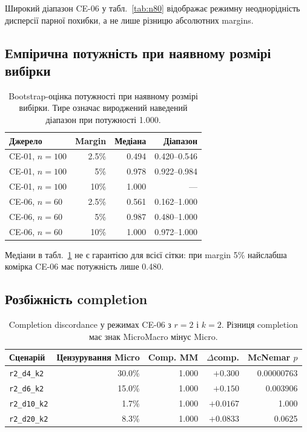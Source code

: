 \documentclass[11pt,a4paper]{article}
\begin{document}
Широкий діапазон CE-06 у табл.~\ref{tab:n80} відображає режимну
неоднорідність дисперсії парної похибки, а не лише різницю абсолютних margins.

\subsection{Емпірична потужність при наявному розмірі вибірки}

\begin{table}[H]
\centering
\caption{Bootstrap-оцінка потужності при наявному розмірі вибірки.
Тире означає вироджений наведений діапазон при потужності 1.000.}
\label{tab:power}
\begin{tabular}{lrrr}
\toprule
Джерело & Margin & Медіана & Діапазон \\
\midrule
CE-01, $n=100$ & 2.5\% & 0.494 & 0.420--0.546 \\
CE-01, $n=100$ & 5\%   & 0.978 & 0.922--0.984 \\
CE-01, $n=100$ & 10\%  & 1.000 & --- \\
CE-06, $n=60$  & 2.5\% & 0.561 & 0.162--1.000 \\
CE-06, $n=60$  & 5\%   & 0.987 & 0.480--1.000 \\
CE-06, $n=60$  & 10\%  & 1.000 & 0.972--1.000 \\
\bottomrule
\end{tabular}
\end{table}

Медіани в табл.~\ref{tab:power} не є гарантією для всієї сітки: при margin
5\% найслабша комірка CE-06 має потужність лише 0.480.

\subsection{Розбіжність completion}

\begin{table}[H]
\centering
\small
\caption{Completion discordance у режимах CE-06 з $r=2$ і $k=2$.
Різниця completion має знак MicroMacro мінус Micro.}
\label{tab:completion}
\begin{tabular}{lrrrr}
\toprule
Сценарій & Цензурування Micro & Comp. MM & $\Delta$comp. & McNemar $p$ \\
\midrule
\texttt{r2\_d4\_k2}  & 30.0\% & 1.000 & $+0.300$  & 0.00000763 \\
\texttt{r2\_d6\_k2}  & 15.0\% & 1.000 & $+0.150$  & 0.003906 \\
\texttt{r2\_d10\_k2} & 1.7\%  & 1.000 & $+0.0167$ & 1.000 \\
\texttt{r2\_d20\_k2} & 8.3\%  & 1.000 & $+0.0833$ & 0.0625 \\
\bottomrule
\end{tabular}
\end{table}
\end{document}
